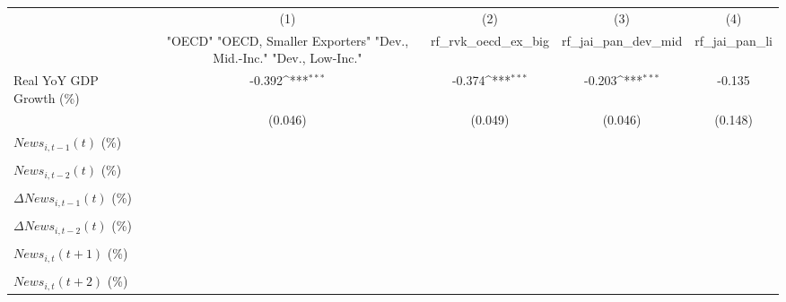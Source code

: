{
\def\sym#1{\ifmmode^{#1}\else\(^{#1}\)\fi}
\begin{tabular}{l*{4}{c}}
\toprule
                    &\multicolumn{1}{c}{(1)}&\multicolumn{1}{c}{(2)}&\multicolumn{1}{c}{(3)}&\multicolumn{1}{c}{(4)}\\
                    &\multicolumn{1}{c}{ "OECD" "OECD, Smaller Exporters" "Dev., Mid.-Inc." "Dev., Low-Inc."}&\multicolumn{1}{c}{rf_rvk_oecd_ex_big}&\multicolumn{1}{c}{rf_jai_pan_dev_mid}&\multicolumn{1}{c}{rf_jai_pan_li}\\
\midrule
Real YoY GDP Growth (\%)&      -0.392\sym{***}&      -0.374\sym{***}&      -0.203\sym{***}&      -0.135         \\
                    &     (0.046)         &     (0.049)         &     (0.046)         &     (0.148)         \\
\addlinespace
$ News_{i,t-1}(t)$ (\%)&                     &                     &                     &                     \\
                    &                     &                     &                     &                     \\
\addlinespace
$ News_{i,t-2}(t)$ (\%)&                     &                     &                     &                     \\
                    &                     &                     &                     &                     \\
\addlinespace
$ \Delta News_{i,t-1}(t)$ (\%)&                     &                     &                     &                     \\
                    &                     &                     &                     &                     \\
\addlinespace
$ \Delta News_{i,t-2}(t)$ (\%)&                     &                     &                     &                     \\
                    &                     &                     &                     &                     \\
\addlinespace
$ News_{i,t}(t+1)$ (\%)&                     &                     &                     &                     \\
                    &                     &                     &                     &                     \\
\addlinespace
$ News_{i,t}(t+2)$ (\%)&                     &                     &                     &                     \\

\end{tabular}}
